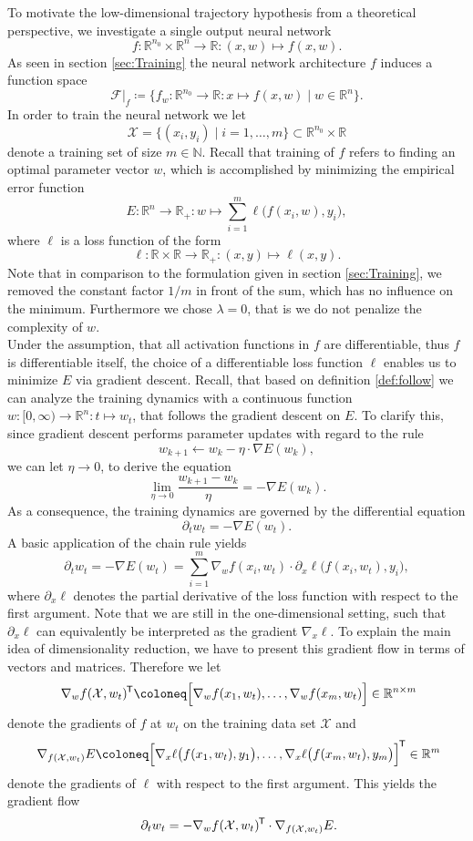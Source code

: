 \documentclass[11pt, a4paper]{article}
\newcommand{\N}{\mathbb{N}}
\newcommand{\R}{\mathbb{R}}
\newcommand{\F}{\mathcal{F}}
\newcommand{\X}{\mathcal{X}}
\newcommand*{\tr}{^{\mkern-1.5mu\mathsf{T}}}
\begin{document}
To motivate the low-dimensional trajectory hypothesis from a theoretical perspective, we investigate a single output neural network
\[ f: \R^{n_0} \times \R^n \to \R : (x,w) \mapsto f(x,w). \]
As seen in section \ref{sec:Training} the neural network architecture $f$ induces a function space
\[ \F |_{f} \coloneq \Big \{ f_w : \R^{n_0} \to \R : x \mapsto f(x,w) \mid w \in \R^n \Big \}. \]
In order to train the neural network we let
\[ \X = \big \{ (x_i,y_i) \mid i=1, \dots, m \big \} \subset \R^{n_0} \times \R \] 
denote a training set of size $m \in \N$. Recall that training of $f$ refers to finding an optimal parameter vector $w$, which is accomplished by minimizing the empirical error function
\[ E : \R^n \to \R_+ : w \mapsto \sum_{i=1}^{m} \ell \big (f(x_i,w), y_i \big ), \]
where $\ell$ is a loss function of the form
\[ \ell: \R \times \R \to \R_+ : (x,y) \mapsto \ell(x,y). \]
Note that in comparison to the formulation given in section \ref{sec:Training}, we removed the constant factor $1/m$ in front of the sum, which has no influence on the minimum. Furthermore we chose $\lambda = 0$, that is we do not penalize the complexity of $w$. \\

Under the assumption, that all activation functions in $f$ are differentiable, thus $f$ is differentiable itself, the choice of a differentiable loss function $\ell$ enables us to minimize $E$ via gradient descent. Recall, that based on definition \ref{def:follow} we can analyze the training dynamics with a continuous function $w : [0, \infty) \to \R^n : t \mapsto w_t$, that follows the gradient descent on $E$. To clarify this, since gradient descent performs parameter updates with regard to the rule
\[ w_{k+1} \leftarrow w_k - \eta \cdot \nabla E(w_k), \]
we can let $\eta \to 0$, to derive the equation
\[ \lim_{\eta \to 0} \frac{w_{k+1} - w_k}{\eta} = - \nabla E(w_k). \]
As a consequence, the training dynamics are governed by the differential equation
\[ \partial_tw_t = -\nabla E (w_t ). \]
A basic application of the chain rule yields
\[ \partial_t w_t = -\nabla E (w_t ) = \sum_{i=1}^{m} \nabla_w f(x_i,w_t) \cdot \partial_x \ell \big ( f(x_i,w_t), y_i \big ), \]
where $\partial_x \ell$ denotes the partial derivative of the loss function with respect to the first argument. Note that we are still in the one-dimensional setting, such that $\partial_x \ell$ can equivalently be interpreted as the gradient $\nabla_x \ell$. To explain the main idea of dimensionality reduction, we have to present this gradient flow in terms of vectors and matrices. Therefore we let
\[ \nabla_w f(\X, w_t)\tr \coloneq \Big [ \nabla_wf(x_1,w_t), \dots, \nabla_wf(x_m, w_t) \Big ] \in \R^{n \times m} \]
denote the gradients of $f$ at $w_t$ on the training data set $\X$ and
\[ \nabla_{f(\X,w_t)} E \coloneq \Big [ \nabla_x \ell \big ( f(x_1,w_t), y_1 \big ), \dots, \nabla_x \ell \big ( f(x_m,w_t), y_m \big ) \Big ]\tr \in \R^m \]
denote the gradients of $\ell$ with respect to the first argument. This yields the gradient flow
\[ \partial_tw_t = - \nabla_w f(\X, w_t)\tr \cdot \nabla_{f(\X,w_t)} E. \]
\end{document}
